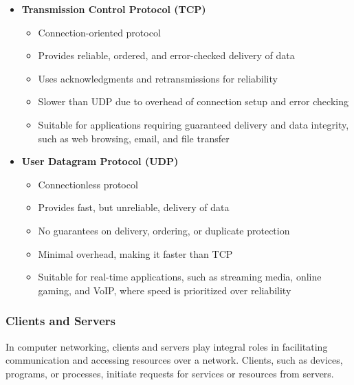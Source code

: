 \begin{itemize}
    \item \textbf{Transmission Control Protocol (TCP)}
    \begin{itemize}
        \item Connection-oriented protocol
        \item Provides reliable, ordered, and error-checked delivery of data
        \item Uses acknowledgments and retransmissions for reliability
        \item Slower than UDP due to overhead of connection setup and error checking
        \item Suitable for applications requiring guaranteed delivery and data integrity, such as web browsing, email, and file transfer
    \end{itemize}

    \item \textbf{User Datagram Protocol (UDP)}
    \begin{itemize}
        \item Connectionless protocol
        \item Provides fast, but unreliable, delivery of data
        \item No guarantees on delivery, ordering, or duplicate protection
        \item Minimal overhead, making it faster than TCP
        \item Suitable for real-time applications, such as streaming media, online gaming, and VoIP, where speed is prioritized over reliability
    \end{itemize}
\end{itemize}

\newpage
\subsubsection{Clients and Servers}
In computer networking, clients and servers play integral roles in facilitating communication and accessing resources over a network. Clients, such as devices, programs, or processes, initiate requests for services or resources from servers.

